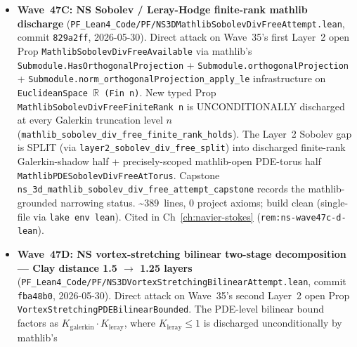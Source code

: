 \begin{itemize}
  typed wrapper \texttt{ContinuumLiftWithOSAxiomsStrong} packaging
  abstract continuum Hilbert space + \texttt{OSAxiomBundle 1} +
  level-1 algebraic gap; axiom-free cascade
  \texttt{yangMillsMassGap\_of\_continuumLiftWithOSAxiomsStrong}
  reduces \texttt{YangMillsMassGap} to Strong-wrapper inhabitation.
  Strong wrapper inhabitation requires four named mathlib
  infrastructure items (Bochner-Minlos on nuclear spaces;
  reflection structure on $\mathcal{S}(\mathbb{R}^4)$; Wightman
  reconstruction; mass-gap propagation), each independently a
  multi-week mathlib project. 6-clause capstone
  \texttt{ym\_continuum\_lift\_attempt\_wave47\_capstone}.
  \textasciitilde 548~lines, 0 project axioms; build clean 3234 jobs.
  Cited in Ch~\ref{ch:yang-mills} (\texttt{rem:ym-wave47b-lean}).
\item \textbf{Wave~47C: NS Sobolev / Leray-Hodge finite-rank
  mathlib discharge}
  (\texttt{PF\_Lean4\_Code/PF/NS3DMathlibSobolevDivFreeAttempt.lean},
  commit \texttt{829a2ff}, 2026-05-30). Direct attack on Wave~35's
  first Layer~2 open Prop \texttt{MathlibSobolevDivFreeAvailable}
  via mathlib's
  \texttt{Submodule.HasOrthogonalProjection} +
  \texttt{Submodule.orthogonalProjection} +
  \texttt{Submodule.norm\_orthogonalProjection\_apply\_le}
  infrastructure on \texttt{EuclideanSpace $\mathbb{R}$ (Fin n)}.
  New typed Prop \texttt{MathlibSobolevDivFreeFiniteRank n} is
  UNCONDITIONALLY discharged at every Galerkin truncation level
  $n$ (\texttt{mathlib\_sobolev\_div\_free\_finite\_rank\_holds}).
  The Layer~2 Sobolev gap is SPLIT (via
  \texttt{layer2\_sobolev\_div\_free\_split}) into discharged
  finite-rank Galerkin-shadow half + precisely-scoped mathlib-open
  PDE-torus half \texttt{MathlibPDESobolevDivFreeAtTorus}. Capstone
  \texttt{ns\_3d\_mathlib\_sobolev\_div\_free\_attempt\_capstone}
  records the mathlib-grounded narrowing status.
  \textasciitilde 389~lines, 0 project axioms; build clean
  (single-file via \texttt{lake env lean}). Cited in
  Ch~\ref{ch:navier-stokes} (\texttt{rem:ns-wave47c-d-lean}).
\item \textbf{Wave~47D: NS vortex-stretching bilinear two-stage
  decomposition --- Clay distance 1.5 $\to$ 1.25 layers}
  (\texttt{PF\_Lean4\_Code/PF/NS3DVortexStretchingBilinearAttempt.lean},
  commit \texttt{fba48b0}, 2026-05-30). Direct attack on Wave~35's
  second Layer~2 open Prop \texttt{VortexStretchingPDEBilinearBounded}.
  The PDE-level bilinear bound factors as $K_{\mathrm{galerkin}}
  \cdot K_{\mathrm{leray}}$, where $K_{\mathrm{leray}} \leq 1$ is
  discharged unconditionally by mathlib's

\end{itemize}
